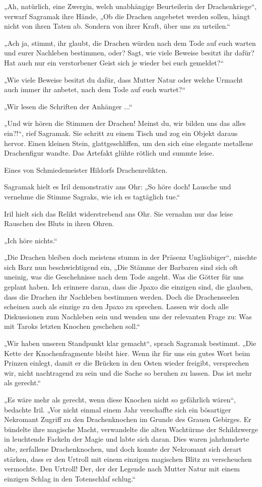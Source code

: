 „Ah, natürlich, eine Zwergin, welch unabhängige Beurteilerin der Drachenkriege“, verwarf Sagramak ihre Hände, „Ob die Drachen angebetet werden sollen, hängt nicht von ihren Taten ab. Sondern von ihrer Kraft, über uns zu urteilen.“

„Ach ja, stimmt, ihr glaubt, die Drachen würden nach dem Tode auf euch warten und eurer Nachleben bestimmen, oder? Sagt, wie viele Beweise besitzt ihr dafür? Hat auch nur ein verstorbener Geist sich je wieder bei euch gemeldet?“

„Wie viele Beweise besitzt du dafür, dass Mutter Natur oder welche Urmacht auch immer ihr anbetet, nach dem Tode auf euch wartet?“

„Wir lesen die Schriften der Anhänger ...“

„Und wir hören die Stimmen der Drachen! Meinst du, wir bilden uns das alles ein?!“, rief Sagramak. Sie schritt zu einem Tisch und zog ein Objekt daraus hervor. Einen kleinen Stein, glattgeschliffen, um den sich eine elegante metallene Drachenfigur wandte. Das Artefakt glühte rötlich und summte leise.

Eines von Schmiedemeister Hildorfs Drachenrelikten.

Sagramak hielt es Iril demonstrativ ans Ohr: „So höre doch! Lausche und vernehme die Stimme Sagraks, wie ich es tagtäglich tue.“

Iril hielt sich das Relikt widerstrebend ans Ohr. Sie vernahm nur das leise Rauschen des Bluts in ihren Ohren.

„Ich höre nichts.“

„Die Drachen bleiben doch meistens stumm in der Präsenz Ungläubiger“, mischte sich Barz nun beschwichtigend ein, „Die Stämme der Barbaren sind sich oft uneinig, was die Geschehnisse nach dem Tode angeht. Was die Götter für uns geplant haben. Ich erinnere daran, dass die Jpaxo die einzigen sind, die glauben, dass die Drachen ihr Nachleben bestimmen werden. Doch die Drachenseelen scheinen auch als einzige zu den Jpaxo zu sprechen. Lassen wir doch alle Diskussionen zum Nachleben sein und wenden uns der relevanten Frage zu: Was mit Taroks letzten Knochen geschehen soll.“

„Wir haben unseren Standpunkt klar gemacht“, sprach Sagramak bestimmt. „Die Kette der Knochenfragmente bleibt hier. Wenn ihr für uns ein gutes Wort beim Prinzen einlegt, damit er die Brücken in den Osten wieder freigibt, versprechen wir, nicht nachtragend zu sein und die Sache so beruhen zu lassen. Das ist mehr als gerecht.“

„Es wäre mehr als gerecht, wenn diese Knochen nicht so gefährlich wären“, bedachte Iril. „Vor nicht einmal einem Jahr verschaffte sich ein bösartiger Nekromant Zugriff zu den Drachenknochen im Grunde des Grauen Gebirges. Er bündelte ihre magische Macht, verwandelte die alten Wachtürme der Schildzwerge in leuchtende Fackeln der Magie und labte sich daran. Dies waren jahrhunderte alte, zerfallene Drachenknochen, und doch konnte der Nekromant sich derart stärken, dass er den Urtroll mit einem einzigen magischen Blitz zu verscheuchen vermochte. Den Urtroll! Der, der der Legende nach Mutter Natur mit einem einzigen Schlag in den Totenschlaf schlug.“

